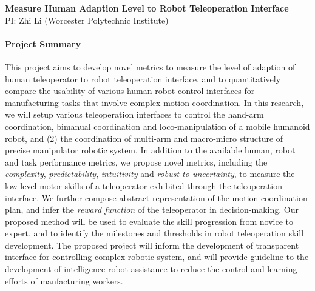 \pagebreak

\begin{center}
	{\Large \bf Measure Human Adaption Level to Robot Teleoperation Interface}\\
    \vspace{4pt}
   	{\large PI: Zhi Li (Worcester Polytechnic Institute)}
\end{center}

\vspace{1 em}

\paragraph*{\Large Project Summary} 
This project aims to develop novel metrics to measure the level of adaption of human teleoperator to robot teleoperation interface, and to quantitatively compare the usability of various human-robot control interfaces for manufacturing tasks that involve complex motion coordination. In this research, we will setup various teleoperation interfaces to control the hand-arm coordination, bimanual coordination and loco-manipulation of a mobile humanoid robot, and (2) the coordination of multi-arm and macro-micro structure of precise manipulator robotic system. 
In addition to the available human, robot and task performance metrics, we propose novel metrics, including the \textit{complexity}, \textit{predictability}, \textit{intuitivity} and \textit{robust to uncertainty}, to measure the low-level motor skills of a teleoperator exhibited through the teleoperation interface. We further compose abstract representation of the motion coordination plan, and infer the \textit{reward function} of the teleoperator in decision-making. Our proposed method will be used to evaluate the skill progression from novice to expert, and to identify the milestones and thresholds in robot teleoperation skill development. The proposed project will inform the development of transparent interface for controlling complex robotic system, and will provide guideline to the development of intelligence robot assistance to reduce the control and learning efforts of manfacturing workers.  









